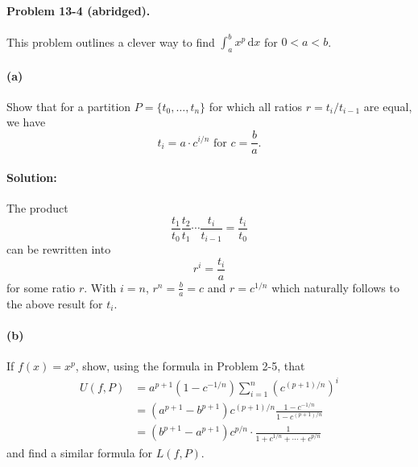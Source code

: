 \documentclass{article}
\begin{document}
\paragraph{Problem 13-4 (abridged).} This problem outlines a clever way to find
$\int_a^b x^p \,\mathrm{d}x$ for $0 < a < b$.

\paragraph{(a)} Show that for a partition $P = \{t_0,
\ldots, t_n\}$ for which all ratios $r = t_i/t_{i - 1}$ are equal, we have
\begin{equation*}
  t_i = a \cdot c^{i/n} \text{ for } c = \frac{b}{a}.
\end{equation*}

\paragraph{Solution:} The product \begin{equation*}
  \frac{t_1}{t_0}\frac{t_2}{t_1}\cdots\frac{t_i}{t_{i - 1}} = \frac{t_i}{t_0}
\end{equation*} can be rewritten into \begin{equation*}
  r^i = \frac{t_i}{a}
\end{equation*} for some ratio $r$. With $i = n$, $r^n = \frac{b}{a} = c$ and
$r = c^{1/n}$ which naturally follows to the above result for $t_i$.

\paragraph{(b)} If $f(x) = x^p$, show, using the formula in Problem 2-5, that
\begin{align*}
  U(f, P) &= a^{p + 1}(1 - c^{-1/n})\sum_{i = 1}^n(c^{(p + 1)/n})^i \\
    &= (a^{p + 1} - b^{p + 1})c^{(p + 1)/n}\frac{1 - c^{-1/n}}{1 - c^{(p +
      1)/n}} \\
    &= (b^{p + 1} - a^{p + 1})c^{p/n} \cdot \frac{1}{1 + c^{1/n} + \cdots +
      c^{p/n}}
\end{align*} and find a similar formula for $L(f, P)$.
\end{document}
